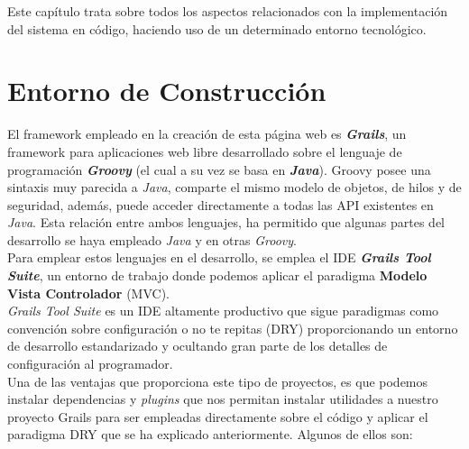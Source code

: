 

Este capítulo trata sobre todos los aspectos relacionados con la implementación del sistema en código, haciendo uso de un determinado entorno tecnológico.

\section{Entorno de Construcción}

El framework empleado en la creación de esta página web es \textit{\textbf{Grails}}, un framework para aplicaciones web libre desarrollado sobre el lenguaje de programación \textit{\textbf{Groovy}} (el cual a su vez se basa en \textit{\textbf{Java}}). Groovy posee una sintaxis muy parecida a \textit{Java}, comparte el mismo modelo de objetos, de hilos y de seguridad, además, puede acceder directamente a todas las API existentes en \textit{Java}. Esta relación entre ambos lenguajes, ha permitido que algunas partes del desarrollo se haya empleado \textit{Java} y en otras \textit{Groovy}.\\

Para emplear estos lenguajes en el desarrollo, se emplea el IDE \textit{\textbf{Grails Tool Suite}}, un entorno de trabajo donde podemos aplicar el paradigma \textbf{Modelo Vista Controlador} (MVC).\\

\textit{Grails Tool Suite} es un IDE altamente productivo que sigue paradigmas como convención sobre configuración o no te repitas (DRY) proporcionando un entorno de desarrollo estandarizado y ocultando gran parte de los detalles de configuración al programador.\\

Una de las ventajas que proporciona este tipo de proyectos, es que podemos instalar dependencias y \textit{plugins} que nos permitan instalar utilidades a nuestro proyecto Grails para ser empleadas directamente sobre el código y aplicar el paradigma DRY que se ha explicado anteriormente. Algunos de ellos son:

